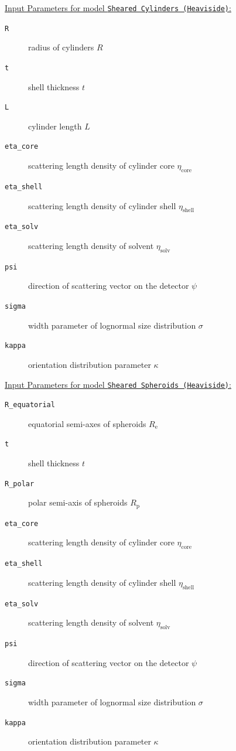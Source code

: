 \vspace{5mm}

\uline{Input Parameters for model \texttt{Sheared Cylinders (Heaviside)}:}\\
\begin{description}
\item[\texttt{R}] radius of cylinders $R$
\item[\texttt{t}] shell thickness $t$
\item[\texttt{L}] cylinder length $L$
\item[\texttt{eta\_core}] scattering length density of cylinder core $\eta_\mathrm{core}$
\item[\texttt{eta\_shell}] scattering length density of cylinder shell $\eta_\mathrm{shell}$
\item[\texttt{eta\_solv}] scattering length density of solvent $\eta_\mathrm{solv}$
\item[\texttt{psi}] direction of scattering vector on the detector $\psi$
\item[{\texttt{sigma}}] width parameter of lognormal size distribution $\sigma$
\item[{\texttt{kappa}}] orientation distribution parameter $\kappa$
\end{description}

\vspace{5mm}

\uline{Input Parameters for model \texttt{Sheared Spheroids (Heaviside)}:}\\
\begin{description}
\item[\texttt{R\_equatorial}] equatorial semi-axes of spheroids $R_\mathrm{e}$
\item[\texttt{t}] shell thickness $t$
\item[\texttt{R\_polar}] polar semi-axis of spheroids $R_\mathrm{p}$
\item[\texttt{eta\_core}] scattering length density of cylinder core $\eta_\mathrm{core}$
\item[\texttt{eta\_shell}] scattering length density of cylinder shell $\eta_\mathrm{shell}$
\item[\texttt{eta\_solv}] scattering length density of solvent $\eta_\mathrm{solv}$
\item[\texttt{psi}] direction of scattering vector on the detector $\psi$
\item[{\texttt{sigma}}] width parameter of lognormal size distribution $\sigma$
\item[{\texttt{kappa}}] orientation distribution parameter $\kappa$
\end{description}

